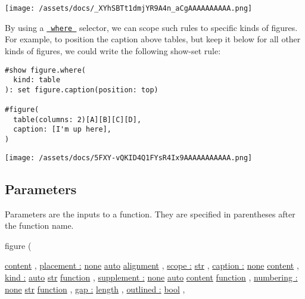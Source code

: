 \texttt{[image: /assets/docs/\_XYhSBTt1dmjYR9A4n\_aCgAAAAAAAAAA.png]}

By using a
\href{/docs/reference/foundations/function/\#definitions-where}{\texttt{\ where\ }}
selector, we can scope such rules to specific kinds of figures. For
example, to position the caption above tables, but keep it below for all
other kinds of figures, we could write the following show-set rule:

\begin{verbatim}
#show figure.where(
  kind: table
): set figure.caption(position: top)

#figure(
  table(columns: 2)[A][B][C][D],
  caption: [I'm up here],
)
\end{verbatim}

\texttt{[image: /assets/docs/5FXY-vQKID4Q1FYsR4Ix9AAAAAAAAAAA.png]}

\subsection{\texorpdfstring{{ Parameters
}}{ Parameters }}\label{parameters}

\label{parameters-tooltip}
Parameters are the inputs to a function. They are specified in
parentheses after the function name.

{ figure } (

{ \href{/docs/reference/foundations/content/}{content} , } {
\hyperref[parameters-placement]{placement :}
\href{/docs/reference/foundations/none/}{none}
\href{/docs/reference/foundations/auto/}{auto}
\href{/docs/reference/layout/alignment/}{alignment} , } {
\hyperref[parameters-scope]{scope :}
\href{/docs/reference/foundations/str/}{str} , } {
\hyperref[parameters-caption]{caption :}
\href{/docs/reference/foundations/none/}{none}
\href{/docs/reference/foundations/content/}{content} , } {
\hyperref[parameters-kind]{kind :}
\href{/docs/reference/foundations/auto/}{auto}
\href{/docs/reference/foundations/str/}{str}
\href{/docs/reference/foundations/function/}{function} , } {
\hyperref[parameters-supplement]{supplement :}
\href{/docs/reference/foundations/none/}{none}
\href{/docs/reference/foundations/auto/}{auto}
\href{/docs/reference/foundations/content/}{content}
\href{/docs/reference/foundations/function/}{function} , } {
\hyperref[parameters-numbering]{numbering :}
\href{/docs/reference/foundations/none/}{none}
\href{/docs/reference/foundations/str/}{str}
\href{/docs/reference/foundations/function/}{function} , } {
\hyperref[parameters-gap]{gap :}
\href{/docs/reference/layout/length/}{length} , } {
\hyperref[parameters-outlined]{outlined :}
\href{/docs/reference/foundations/bool/}{bool} , }

